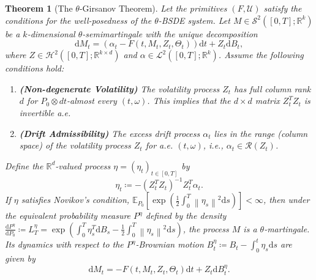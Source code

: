 \documentclass[12pt, letterpaper]{amsart}
\newcommand{\Ucal}{\mathcal{U}}
\newcommand{\Scalp}[1]{\mathcal{S}^{#1}}
\newcommand{\Hcalp}[1]{\mathcal{H}^{#1}}
\newcommand{\Lcalp}[1]{\mathcal{L}^{#1}}
\newcommand{\R}{\mathbb{R}}
\newcommand{\dd}{\mathrm{d}}
\newcommand{\norm}[1]{\left\lVert#1\right\rVert}
\theoremstyle{plain}
\newtheorem{theorem}{Theorem}[section]
\theoremstyle{definition}
\theoremstyle{remark}
\numberwithin{equation}{section} %
\begin{document}
\begin{theorem}[The \(\theta\)-Girsanov Theorem]
\label{thm:theta_girsanov}
Let the primitives \((F, \Ucal)\) satisfy the conditions for the well-posedness of the \(\theta\)-BSDE system. Let \(M \in \Scalp{2}([0,T]; \R^k)\) be a \(k\)-dimensional \(\theta\)-semimartingale with the unique decomposition
\begin{equation}
    \dd M_t = \left(\alpha_t - F(t, M_t, Z_t, \Theta_t)\right) \dd t + Z_t \dd B_t,
\end{equation}
where \(Z \in \Hcalp{2}([0,T]; \R^{k \times d})\) and \(\alpha \in \Lcalp{2}([0,T]; \R^k)\). Assume the following conditions hold:
\begin{enumerate}[label=(\roman*)]
    \item \textbf{(Non-degenerate Volatility)} The volatility process \(Z_t\) has full column rank \(d\) for \(P_0 \otimes dt\)-almost every \((t,\omega)\). This implies that the \(d \times d\) matrix \(Z_t^T Z_t\) is invertible a.e.
    \item \textbf{(Drift Admissibility)} The excess drift process \(\alpha_t\) lies in the range (column space) of the volatility process \(Z_t\) for a.e. \((t,\omega)\), i.e., \(\alpha_t \in \mathcal{R}(Z_t)\).
\end{enumerate}
Define the \(\R^d\)-valued process \(\eta = (\eta_t)_{t\in[0,T]}\) by
\begin{equation}\label{eq:girsanov_kernel}
    \eta_t \coloneqq -(Z_t^T Z_t)^{-1} Z_t^T \alpha_t.
\end{equation}
If \(\eta\) satisfies Novikov's condition, \(\mathbb{E}_{P_0}\left[\exp\left(\frac{1}{2}\int_0^T \norm{\eta_s}^2 \dd s\right)\right] < \infty\), then under the equivalent probability measure \(P^\eta\) defined by the density \(\frac{\dd P^\eta}{\dd P_0} \coloneqq L_T^\eta = \exp\left( \int_0^T \eta_s^T \dd B_s - \frac{1}{2} \int_0^T \norm{\eta_s}^2 \dd s \right)\), the process \(M\) is a \(\theta\)-martingale. Its dynamics with respect to the \(P^\eta\)-Brownian motion \(B^\eta_t \coloneqq B_t - \int_0^t \eta_s \dd s\) are given by
\begin{equation}
    \dd M_t = -F(t, M_t, Z_t, \Theta_t) \dd t + Z_t \dd B_t^\eta.
\end{equation}
\end{theorem}
\end{document}
